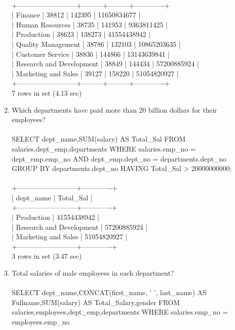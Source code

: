 \documentclass[]{article}
\begin{document}
\begin{enumerate}
\\
+--------------------------+---------+---------+-------------+
\\
| Finance                  |   38812 |  142395 | 11650834677 |
\\
| Human Resources          |   38735 |  141953 |  9363811425 |
\\
| Production               |   38623 |  138273 | 41554438942 |
\\
| Quality Management       |   38786 |  132103 | 10865203635 |
\\
| Customer Service         |   38836 |  144866 | 13143639841 |
\\
| Research and Development |   38849 |  144434 | 57200885924 |
\\
| Marketing and Sales      |   39127 |  158220 | 51054820927 |
\\
+--------------------------+---------+---------+-------------+
\\
7 rows in set (4.13 sec)
\\
\item Which departments have paid more than 20 billion dollars for their employees?
\\\\
SELECT dept\_name,SUM(salary) AS Total\_Sal FROM salaries,dept\_emp,departments
WHERE salaries.emp\_no = dept\_emp.emp\_no
AND
dept\_emp.dept\_no = departments.dept\_no
GROUP BY departments.dept\_no
HAVING Total\_Sal > 20000000000;
\\\\
+--------------------------+-------------+
\\
| dept\_name                | Total\_Sal   |
\\
+--------------------------+-------------+
\\
| Production               | 41554438942 |
\\
| Research and Development | 57200885924 |
\\
| Marketing and Sales      | 51054820927 |
\\
+--------------------------+-------------+
\\
3 rows in set (3.47 sec)
\\
\item Total salaries of male employees in each department?
\\\\
SELECT dept\_name,CONCAT(first\_name, ' ', last\_name) AS Fullname,SUM(salary) AS Total\_Salary,gender FROM salaries,employees,dept\_emp,departments
WHERE salaries.emp\_no = employees.emp\_no

\end{enumerate}
\end{document}
